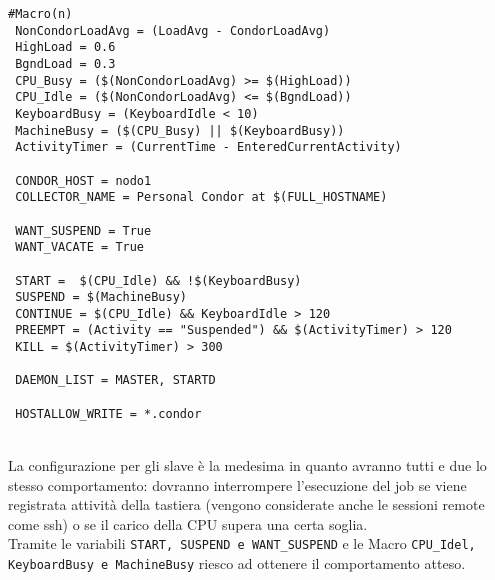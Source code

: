 \begin{lstlisting}[style=cmd]
 #Macro(n)
 NonCondorLoadAvg = (LoadAvg - CondorLoadAvg)
 HighLoad = 0.6
 BgndLoad = 0.3
 CPU_Busy = ($(NonCondorLoadAvg) >= $(HighLoad))
 CPU_Idle = ($(NonCondorLoadAvg) <= $(BgndLoad))
 KeyboardBusy = (KeyboardIdle < 10)
 MachineBusy = ($(CPU_Busy) || $(KeyboardBusy))
 ActivityTimer = (CurrentTime - EnteredCurrentActivity)
 
 CONDOR_HOST = nodo1
 COLLECTOR_NAME = Personal Condor at $(FULL_HOSTNAME)
 
 WANT_SUSPEND = True
 WANT_VACATE = True
 
 START =  $(CPU_Idle) && !$(KeyboardBusy)
 SUSPEND = $(MachineBusy)
 CONTINUE = $(CPU_Idle) && KeyboardIdle > 120
 PREEMPT = (Activity == "Suspended") && $(ActivityTimer) > 120     
 KILL = $(ActivityTimer) > 300

 DAEMON_LIST = MASTER, STARTD
 
 HOSTALLOW_WRITE = *.condor
\end{lstlisting}
\ \\
La configurazione per gli slave \`{e} la medesima in quanto avranno tutti e due lo stesso comportamento: dovranno interrompere l'esecuzione del job se viene registrata attivit\`{a} della tastiera (vengono considerate anche le sessioni remote come ssh) o se il carico della CPU supera una certa soglia.\\
Tramite le variabili \lstinline[style=cmd]|START, SUSPEND e WANT_SUSPEND| e le Macro \lstinline[style=cmd]|CPU_Idel, KeyboardBusy e MachineBusy| riesco ad ottenere il comportamento atteso.

